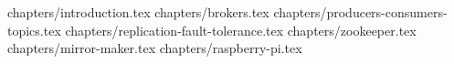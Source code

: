 \documentclass[a4paper,12pt]{article}
\begin{document}
 
 
 

\tableofcontents
\clearpage

{chapters/introduction.tex}
{chapters/brokers.tex}
{chapters/producers-consumers-topics.tex}
{chapters/replication-fault-tolerance.tex}
{chapters/zookeeper.tex}
{chapters/mirror-maker.tex}
{chapters/raspberry-pi.tex}
 


\end{document}
